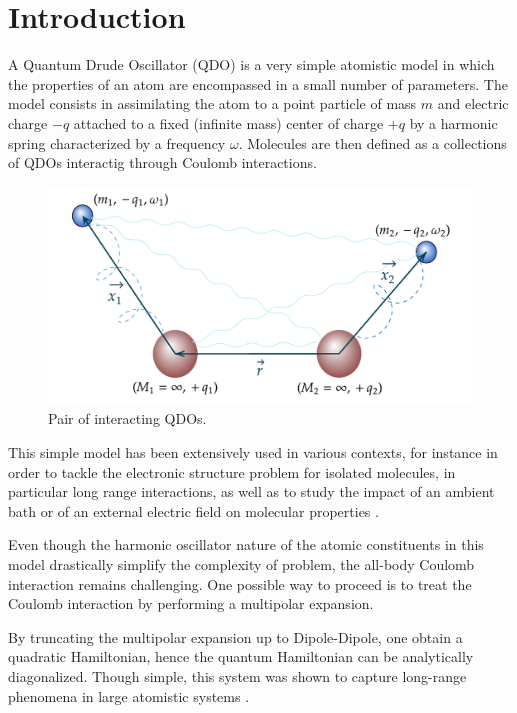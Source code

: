 \documentclass[reprint, amsmath, amssymb, aps, prl]{revtex4-2}
\begin{document}
\section{Introduction}

    A Quantum Drude Oscillator (QDO) is a very simple atomistic model in which the properties of an atom are encompassed in a small number of parameters. The model consists in assimilating the atom to a point particle of mass $m$ and electric charge $-q$ attached to a fixed (infinite mass) center of charge $+q$ by a harmonic spring characterized by a frequency $\omega$. Molecules are then defined as a collections of QDOs interactig through Coulomb interactions.

    \begin{figure}[h!]
    \centering
        \includegraphics[scale=0.49]{QDOs}
        \caption{\label{fig:epsart} Pair of interacting QDOs.}
    \end{figure}

    This simple model has been extensively used in various contexts, for instance in order to tackle the electronic structure problem for isolated molecules, in particular long range interactions, as well as to study the impact of an ambient bath or of an external electric field on molecular properties \cite{Karimpour_2022}.

    Even though the harmonic oscillator nature of the atomic constituents in this model drastically simplify the complexity of problem, the all-body Coulomb interaction remains challenging. One possible way to proceed is to treat the Coulomb interaction by performing a multipolar expansion.

    By truncating the multipolar expansion up to Dipole-Dipole, one obtain a quadratic Hamiltonian, hence the quantum Hamiltonian can be analytically diagonalized. Though simple, this system was shown to capture long-range phenomena in large atomistic systems \cite{https://doi.org/10.48550/arxiv.2205.11549}.
\end{document}
